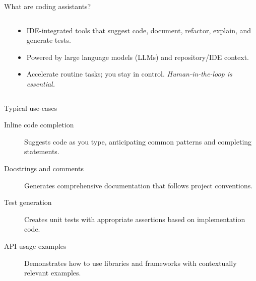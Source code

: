 \documentclass[
  aspectratio=1610,
]{beamer}
\begin{document}
\begin{frame}{What are coding assistants?}
  \begin{columns}
    \begin{column}{0.6\textwidth}
    \end{column}
    \begin{column}{0.4\textwidth}
      \begin{itemize}
        \item IDE-integrated tools that suggest code, document, refactor, explain, and generate tests.
        \item Powered by large language models (LLMs) and repository/IDE context.
        \item Accelerate routine tasks; you stay in control. \emph{Human-in-the-loop is essential.}
      \end{itemize}
    \end{column}
  \end{columns}
\end{frame}


\begin{frame}{Typical use-cases}
  \begin{description}
    \item[Inline code completion] Suggests code as you type, anticipating common patterns and completing statements.
    \item[Docstrings and comments] Generates comprehensive documentation that follows project conventions.
    \item[Test generation] Creates unit tests with appropriate assertions based on implementation code.
    \item[API usage examples] Demonstrates how to use libraries and frameworks with contextually relevant examples.
  \end{description}
\end{frame}
\end{document}

